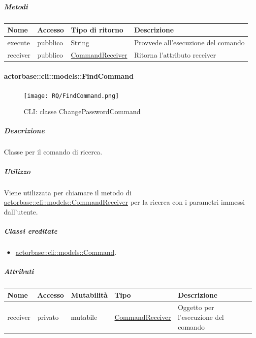 \documentclass{scalatekids-article}
\begin{document}
\subparagraph{Metodi}

\begin{tabular}{| l | l | l | l |}
  \hline
  Nome & Accesso & Tipo di ritorno & Descrizione\\
  \hline
  execute & pubblico & String & Provvede all'esecuzione del comando\\
  \hline
  receiver & pubblico & \hyperref[sec:actorbase::cli::models::CommandReceiver]{CommandReceiver} & Ritorna l'attributo receiver\\
  \hline
\end{tabular}


\paragraph{actorbase::cli::models::FindCommand}
\label{sec:actorbase::cli::models::FindCommand}

\begin{figure}[H]
  \begin{center}
    \texttt{[image: RQ/FindCommand.png]}
    \caption{CLI: classe ChangePasswordCommand}
  \end{center}
\end{figure}

\subparagraph{Descrizione}

Classe per il comando di ricerca.

\subparagraph{Utilizzo}

Viene utilizzata per chiamare il metodo di
\hyperref[sec:actorbase::cli::models::CommandReceiver]{actorbase::cli::models::CommandReceiver} per la ricerca con i parametri immessi
dall'utente.

\subparagraph{Classi ereditate}

\begin{itemize}
\item \hyperref[sec:actorbase::cli::models::Command]{actorbase::cli::models::Command}.
\end{itemize}

\subparagraph{Attributi}

\begin{tabular}{| p{1cm} | p{1.5cm} | p{2cm} | p{4cm} | p{8.5cm} |}
  \hline
  Nome & Accesso & Mutabilità & Tipo & Descrizione\\
  \hline
  receiver & privato & mutabile & \hyperref[sec:actorbase::cli::models::CommandReceiver]{CommandReceiver} & Oggetto per l'esecuzione del comando \\
  \hline
\end{tabular}
\end{document}

